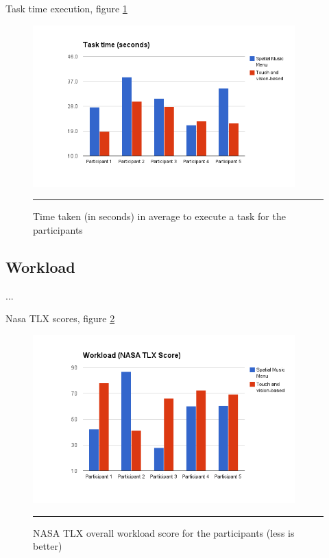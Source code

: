 Task time execution, figure \ref{fig:resultstasktime}

\begin{figure}[htbp]
	\centering
		\includegraphics[width=0.9\textwidth,height=\textheight,keepaspectratio]{./Figures/results_task_time.png}
		\rule{35em}{1pt}
	\caption[Results task time]{Time taken (in seconds) in average to execute a task for the participants}
	\label{fig:resultstasktime}
\end{figure}

\subsection{Workload}
...

Nasa TLX scores, figure \ref{fig:resultsnasatlx}

\begin{figure}[htbp]
	\centering
		\includegraphics[width=0.9\textwidth,height=\textheight,keepaspectratio]{./Figures/results_nasatlx.png}
		\rule{35em}{1pt}
	\caption[Results NASA TLX Score]{NASA TLX overall workload score for the participants (less is better)}
	\label{fig:resultsnasatlx}
\end{figure}

